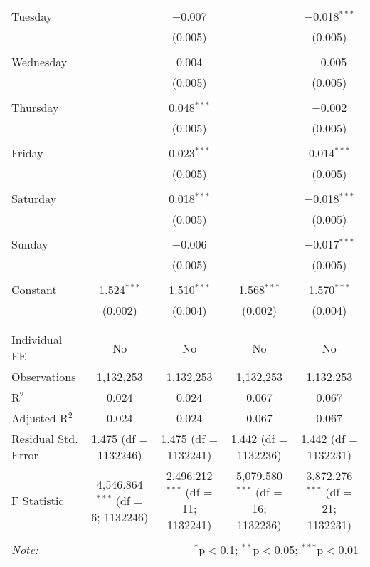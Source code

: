 \documentclass[
]{article}
\begin{document}
\begin{table}[!htbp]
{\begin{tabular}{@{\extracolsep{5pt}}lcccc}
 Tuesday &  & $-$0.007 &  & $-$0.018$^{***}$ \\ 
  &  & (0.005) &  & (0.005) \\ 
  & & & & \\ 
 Wednesday &  & 0.004 &  & $-$0.005 \\ 
  &  & (0.005) &  & (0.005) \\ 
  & & & & \\ 
 Thursday &  & 0.048$^{***}$ &  & $-$0.002 \\ 
  &  & (0.005) &  & (0.005) \\ 
  & & & & \\ 
 Friday &  & 0.023$^{***}$ &  & 0.014$^{***}$ \\ 
  &  & (0.005) &  & (0.005) \\ 
  & & & & \\ 
 Saturday &  & 0.018$^{***}$ &  & $-$0.018$^{***}$ \\ 
  &  & (0.005) &  & (0.005) \\ 
  & & & & \\ 
 Sunday &  & $-$0.006 &  & $-$0.017$^{***}$ \\ 
  &  & (0.005) &  & (0.005) \\ 
  & & & & \\ 
 Constant & 1.524$^{***}$ & 1.510$^{***}$ & 1.568$^{***}$ & 1.570$^{***}$ \\ 
  & (0.002) & (0.004) & (0.002) & (0.004) \\ 
  & & & & \\ 
\hline \\[-1.8ex] 
Individual FE & No & No & No & No \\ 
Observations & 1,132,253 & 1,132,253 & 1,132,253 & 1,132,253 \\ 
R$^{2}$ & 0.024 & 0.024 & 0.067 & 0.067 \\ 
Adjusted R$^{2}$ & 0.024 & 0.024 & 0.067 & 0.067 \\ 
Residual Std. Error & 1.475 (df = 1132246) & 1.475 (df = 1132241) & 1.442 (df = 1132236) & 1.442 (df = 1132231) \\ 
F Statistic & 4,546.864$^{***}$ (df = 6; 1132246) & 2,496.212$^{***}$ (df = 11; 1132241) & 5,079.580$^{***}$ (df = 16; 1132236) & 3,872.276$^{***}$ (df = 21; 1132231) \\ 
\hline 
\hline \\[-1.8ex] 
\textit{Note:}  & \multicolumn{4}{r}{$^{*}$p$<$0.1; $^{**}$p$<$0.05; $^{***}$p$<$0.01} \\ 
\end{tabular}
} 
\end{table} 
\newpage
\end{document}
